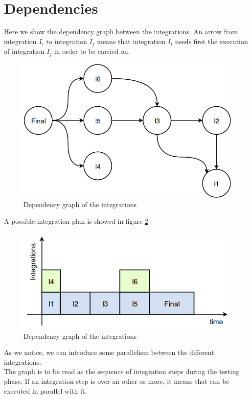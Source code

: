 \section{Dependencies}
Here we show the dependency graph between the integrations. An arrow from integration $I_i$ to integration $I_j$ means that integration $I_i$ needs first the execution of integration $I_j$ in order to be carried on.
\begin{figure}[H]
	\centering
	\includegraphics[scale = 0.5]{"../Analysis Documents/Dependencies"}
	\caption{Dependency graph of the integrations}
	\label{fig:dependency}
\end{figure}

A possible integration plan is showed in figure \ref{fig:schedule}
\begin{figure}[H]
	\centering
	\includegraphics[scale = 0.6]{"../Analysis Documents/schedule"}
	\caption{Dependency graph of the integrations}
	\label{fig:schedule}
\end{figure}
As we notice, we can introduce some parallelism between the different integrations.\\The graph is to be read as the sequence of integration steps during the testing phase. If an integration step is over an other or more, it means that can be executed in parallel with it.